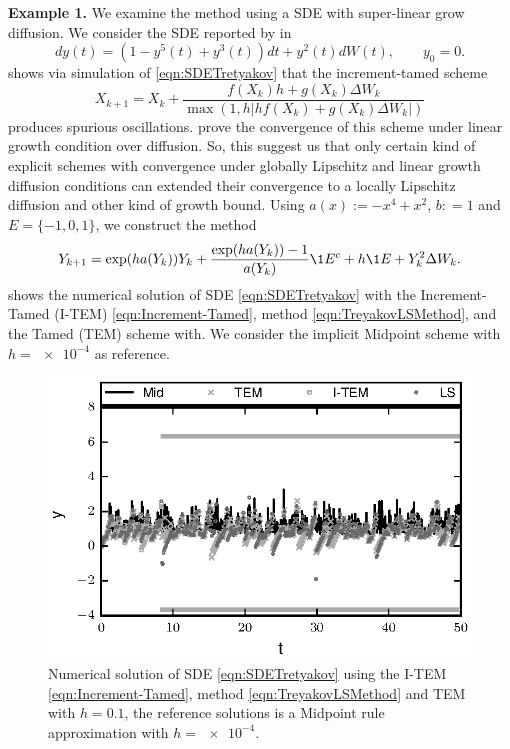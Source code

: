 {\textbf{Example 1.}} We examine the \SM method using a SDE with super-linear grow diffusion. We 
	consider the SDE reported by \citeauthor*{Tretyakov2013} in \cite[Eq. (5.6)]{Tretyakov2013}
	\begin{equation}\label{eqn:SDETretyakov}
		dy(t) =
		\left(
			1-y^5(t) +y^3(t)  
		\right) dt
		+
		y^2(t) dW(t), \qquad y_0=0.
	\end{equation}
	\citeauthor{Tretyakov2013} shows via simulation of \eqref{eqn:SDETretyakov} that the increment-tamed scheme
	\cite[Eq(1.5)]{Hutzenthaler2015}
	\begin{equation}\label{eqn:Increment-Tamed}
		X_{k+1} = X_k + 
			\frac{
				f(X_k) h + 
				g(X_k)\Delta W_k 
			}{
			\max\left(
				1, h
				\left|
					h f(X_k) +
					g(X_k)\Delta W_k
				\right|
			\right)}
	\end{equation}
	produces spurious oscillations. \citeauthor{Hutzenthaler2015} prove the convergence of this scheme under
	linear growth condition over diffusion. So, this suggest us that only certain kind of 
	explicit schemes with convergence under globally Lipschitz and linear growth diffusion conditions	
	can extended their convergence to a locally Lipschitz diffusion and other kind of growth bound.
	Using $a(x):= -x^4 +x^2$, $b: = 1$ and $E=\{-1,0,1\}$, we construct the \SM method
	\begin{equation}\label{eqn:TreyakovLSMethod}
		Y_{k+1} = \exp(ha(Y_k))Y_k + 
		\frac{\exp(ha(Y_k)) - 1}{a(Y_k)} \1{E^c}
		+h\1{E}
		+Y_k^2\Delta W_k. 		
	\end{equation}
	 shows the numerical solution of SDE \eqref{eqn:SDETretyakov} with the Increment-Tamed (I-TEM) 
	\eqref{eqn:Increment-Tamed}, \SM method \eqref{eqn:TreyakovLSMethod}, and the Tamed (TEM) scheme with. 
	We consider the implicit Midpoint scheme \cite[Eq.(5.3)]{Tretyakov2013} with $h=\num{e-4}$ 	as reference.
	\begin{figure}[h!]
		\centering
		\includegraphics{Tretyakov}
		\caption{
			Numerical solution of SDE \eqref{eqn:SDETretyakov} using the I-TEM 
			\eqref{eqn:Increment-Tamed}, \SM method \eqref{eqn:TreyakovLSMethod}  and TEM
			with $h=\num{0.1}$, the reference solutions is a Midpoint rule approximation with $h=\num{e-4}$.
			}
		\label{fig:Tretyakov}
	\end{figure}
